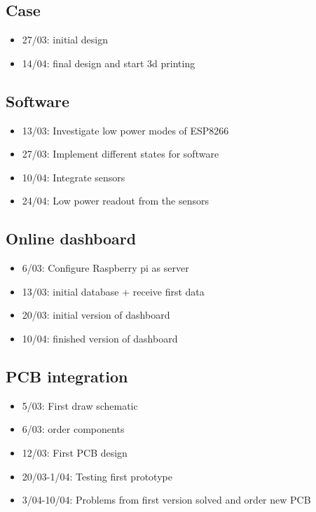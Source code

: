 \documentclass[11pt,a4paper]{article}
\begin{document}
	\subsection{Case}
	\begin{itemize}
		\item 27/03: initial design
		\item 14/04: final design and start 3d printing 
	\end{itemize}
	
	\subsection{Software}
	\begin{itemize}
		\item 13/03: Investigate low power modes of ESP8266
		\item 27/03: Implement different states for software
		\item 10/04: Integrate sensors
		\item 24/04: Low power readout from the sensors
	\end{itemize}

	\subsection{Online dashboard}
	\begin{itemize}
		\item 6/03: Configure Raspberry pi as server
		\item 13/03: initial database + receive first data
		\item 20/03: initial version of dashboard
		\item 10/04: finished version of dashboard
	\end{itemize}

	\subsection{PCB integration}
	\begin{itemize}
		\item 5/03: First draw schematic
		\item 6/03: order components
		\item 12/03: First PCB design
		\item 20/03-1/04: Testing first prototype
		\item 3/04-10/04: Problems from first version solved and order new PCB 
	\end{itemize}
\end{document}

